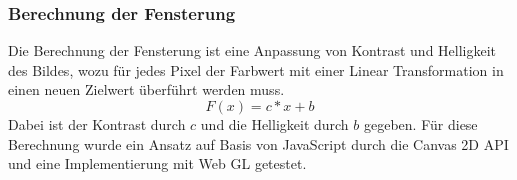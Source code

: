 \subsubsection{Berechnung der Fensterung}
\label{sec:Berehnung_der_Fensterung}
Die Berechnung der Fensterung ist eine Anpassung von Kontrast und Helligkeit des Bildes,
wozu für jedes Pixel der Farbwert mit einer Linear Transformation in einen neuen Zielwert überführt werden muss.
\begin{equation}
        F(x) = c*x + b
\end{equation}
Dabei ist der Kontrast durch $c$ und die Helligkeit durch $b$ gegeben.
Für diese Berechnung wurde ein Ansatz auf Basis von JavaScript durch die Canvas 2D API und eine Implementierung mit Web GL getestet.

